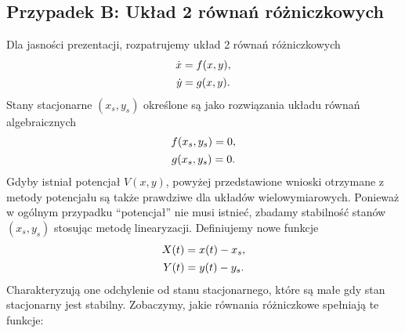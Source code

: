 \documentclass[a4paper,12pt,polish]{sphinxmanual}
\begin{document}
\subsection{Przypadek B: Układ  2 równań różniczkowych}
\label{ch1/chI023:przypadek-b-uklad-2-rownan-rozniczkowych}
Dla jasności prezentacji, rozpatrujemy układ 2 równań różniczkowych
\label{ch1/chI023:equation-eqn26}\begin{gather}
\begin{split}\dot x = f(x, y),\end{split}\label{ch1/chI023-eqn26}\\\begin{split}\dot y = g(x, y).\end{split}\notag
\end{gather}
Stany stacjonarne $(x_s, y_s)$  określone są jako rozwiązania układu równań algebraicznych
\label{ch1/chI023:equation-eqn27}\begin{gather}
\begin{split}f(x_s, y_s)=0,\end{split}\label{ch1/chI023-eqn27}\\\begin{split}g(x_s, y_s) =0.\end{split}\notag
\end{gather}
Gdyby istniał potencjał $V(x, y)$, powyżej przedstawione wnioski otrzymane z metody potencjału są  także prawdziwe dla układów wielowymiarowych. Ponieważ w ogólnym  przypadku ``potencjał'' nie musi istnieć,  zbadamy  stabilność stanów   $(x_s, y_s)$  stosując metodę linearyzacji. Definiujemy  nowe funkcje
\label{ch1/chI023:equation-eqn28}\begin{gather}
\begin{split}X(t) = x(t) - x_s,\end{split}\label{ch1/chI023-eqn28}\\\begin{split}Y(t)=y(t)-y_s.\end{split}\notag
\end{gather}
Charakteryzują one odchylenie od stanu stacjonarnego, które są małe gdy stan stacjonarny jest stabilny. Zobaczymy, jakie równania różniczkowe spełniają te funkcje:
\end{document}
